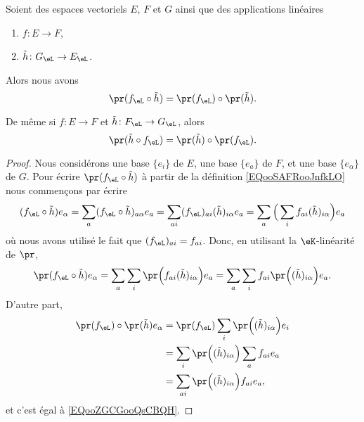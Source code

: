 \begin{lemma}       \label{LEMooWZGSooONEnjZ}
	Soient des espaces vectoriels \( E\), \( F\) et \( G\) ainsi que des applications linéaires
	\begin{enumerate}
		\item
		      \( f\colon E\to F\),
		\item
		      \( \tilde h\colon G_{\eL}\to E_{\eL}\).
	\end{enumerate}
	Alors nous avons
	\begin{equation}
		\pr(f_{\eL}\circ \tilde h)=\pr(f_{\eL})\circ\pr(\tilde h).
	\end{equation}

	De même si \( f\colon E\to F\) et \( \tilde h\colon F_{\eL}\to G_{\eL}\), alors
	\begin{equation}
		\pr(\tilde h\circ f_{\eL})=\pr(\tilde h)\circ \pr(f_{\eL}).
	\end{equation}
\end{lemma}

\begin{proof}
	Nous considérons une base \( \{ e_i \}\) de \( E\), une base \( \{ e_a \}\) de \( F\), et une base \( \{ e_{\alpha} \} \) de \( G\). Pour écrire \( \pr(f_{\eL}\circ \tilde h)\) à partir de la définition \eqref{EQooSAFRooJnfkLO} nous commençons par écrire
	\begin{equation}
		(f_{\eL}\circ \tilde h)e_{\alpha}=\sum_a(f_{\eL}\circ \tilde h)_{a\alpha}e_a=\sum_{ai}(f_{\eL})_{ai}(\tilde h)_{i\alpha}e_a=\sum_a\Big( \sum_{i}f_{ai}(\tilde h)_{i\alpha} \Big)e_a
	\end{equation}
	où nous avons utilisé le fait que \( (f_{\eL})_{ai}=f_{ai}\). Donc, en utilisant la \( \eK\)-linéarité de \( \pr\),
	\begin{equation}        \label{EQooZGCGooQsCBQH}
		\pr(f_{\eL}\circ \tilde h)e_{\alpha}=\sum_a\sum_i\pr\Big( f_{ai}(\tilde h)_{i\alpha} \Big)e_a=\sum_a\sum_if_{ai}\pr\Big( (\tilde h)_{i\alpha} \Big)e_a.
	\end{equation}
	D'autre part,
	\begin{equation}
		\begin{aligned}[]
			\pr(f_{\eL})\circ \pr(\tilde h)e_{\alpha} & =\pr(f_{\eL})\sum_i\pr\Big( (\tilde h)_{i\alpha} \Big)e_i \\
			                                          & =\sum_i\pr\Big( (\tilde h)_{i\alpha} \Big)\sum_af_{ai}e_a \\
			                                          & =\sum_{ai}\pr\Big( (\tilde h)_{i\alpha} \Big)f_{ai}e_a,
		\end{aligned}
	\end{equation}
	et c'est égal à \eqref{EQooZGCGooQsCBQH}.
\end{proof}

